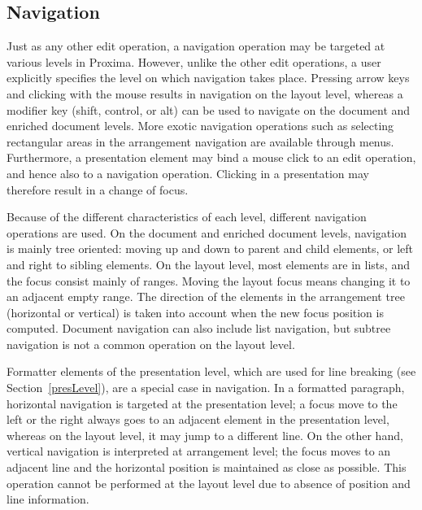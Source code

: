 \subsection{Navigation}

Just as any other edit operation, a navigation operation may be targeted at various levels in Proxima. However, unlike the other edit operations, a user explicitly specifies the level on which navigation takes place. Pressing arrow keys and clicking with the mouse results in navigation on the layout level, whereas a modifier key (shift, control, or alt) can be used to navigate on the document and enriched document levels. More exotic navigation operations such as selecting rectangular areas in the arrangement navigation are available through menus. Furthermore, a presentation element may bind a mouse click to an edit operation, and hence also to a navigation operation. Clicking in a presentation may therefore result in a change of focus.

Because of the different characteristics of each level, different navigation operations are used. On the document and enriched document levels, navigation is mainly tree oriented: moving up and down to parent and child elements, or left and right to sibling elements. On the layout level, most elements are in lists, and the focus consist mainly of ranges. Moving the layout focus means changing it to an adjacent empty range. The direction of the elements in the arrangement tree (horizontal or vertical) is taken into account when the new focus position is computed. Document navigation can also include list navigation, but subtree navigation is not a common operation on the layout level.


Formatter elements of the presentation level, which are used for line breaking (see Section~\ref{presLevel}), are a special case in navigation. In a formatted paragraph, horizontal navigation is targeted at the presentation level; a focus move to the left or the right always goes to an adjacent element in the presentation level, whereas on the layout level, it may jump to a different line. On the other hand, vertical navigation is interpreted at arrangement level; the focus moves to an adjacent line and the horizontal position is maintained as close as possible. This operation cannot be performed at the layout level due to absence of position and line information. 

